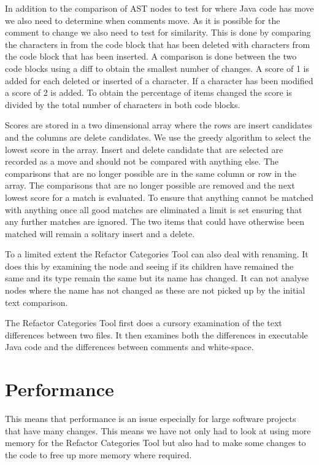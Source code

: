 In addition to the comparison of AST nodes to test for where Java code has move we also need to determine when comments move.  As it is possible for the comment to change we also need to test for similarity.  This is done by comparing the characters in from the code block that has been deleted with characters from the code block that has been inserted.  A comparison is done between the two code blocks using a diff to obtain the smallest number of changes. A score of 1 is added for each deleted or inserted of a character.  If a character has been modified a score of 2 is added. To obtain the percentage of items changed the score is divided by the total number of characters in both code blocks.

Scores are stored in a two dimensional array where the rows are insert candidates and the columns are delete candidates.  We use the greedy algorithm to select the lowest score in the array.  Insert and delete candidate that are selected are recorded as a move and should not be compared with anything else. The comparisons that are no longer possible are in the same column or row in the array.  The comparisons that are no longer possible are removed and the next lowest score for a match is evaluated.  To ensure that anything cannot be matched with anything once all good matches are eliminated a limit is set ensuring that any further matches are ignored.  The two items that could have otherwise been matched will remain a solitary insert and a delete.

To a limited extent the Refactor Categories Tool can also deal with renaming. It does this by examining the node and seeing if its children have remained the same and its type remain the same but its name has changed. It can not analyse nodes where the name has not changed as these are not picked up by the initial text comparison.

The Refactor Categories Tool first does a cursory examination of the text differences between two files. It then examines both the differences in executable Java code and the differences between comments and white-space. 



\section{Performance}
 This means that performance is an issue especially for large software projects that have many changes. This means we have not only had to look at using more memory for the Refactor Categories Tool but also had to make some changes to the code to free up more memory where required.

